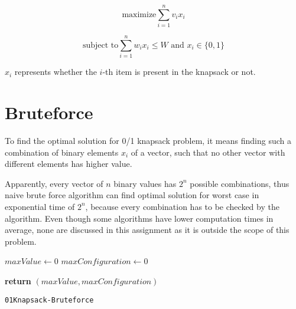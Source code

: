 \documentclass{article}
\begin{document}
\begin{equation}
	\text{maximize}\sum_{i=1}^{n}{v_ix_i}
\end{equation}


\begin{equation}
	\text{subject to}\sum_{i=1}^{n}{w_ix_i} \leq W \text{ and }  x_i \in \{0,1\}
\end{equation}
\begin{info}
	$x_i$ represents whether the $i$-th item is present in the knapsack or not.
\end{info}
	\section{Bruteforce}
		To find the optimal solution for 0/1 knapsack problem, it means finding such a combination of binary elements $x_i$ of a vector, such that no other vector with different elements has higher value. 

		Apparently, every vector of $n$ binary values has $2^n$ possible combinations, thus naive brute force algorithm can find optimal solution for worst case in exponential time of $2^n$, because every combination has to be checked by the algorithm. Even though some algorithms have lower computation times in average, none are discussed in this assignment as it is outside the scope of this problem.

		\begin{center}
			\begin{minipage}{1\linewidth} %
				\begin{algorithm}[H]
					\hrulefill
					\medskip

					$maxValue \leftarrow 0$ \;
					$maxConfiguration \leftarrow 0$ \;

					{\bf return} $(maxValue,maxConfiguration)$ \;
					\caption{\texttt{01Knapsack-Bruteforce}} %
					\label{alg:knapsack-bruteforce}   %
				\end{algorithm}
			\end{minipage}
		\end{center}
\end{document}
